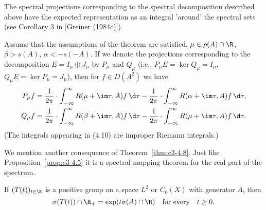 The spectral projections corresponding to the spectral decomposition
described above have the expected representation as an integral
'around' the spectral sets (see Corollary 3 in [Greiner (1984c)]).

\begin{corollary}\label{cor:c3-4.9}
Assume that the assumptions of the theorem are satisfied, $\mu \in \rho(A) \cap \R $, $\beta > s(A)$, $\alpha < -s(-A)$. If we denote the projections corresponding to the decomposition $E = I_{\mu} \oplus J_{\mu}$ by $P_{\mu}$ and $Q_{\mu}$
(i.e., $P_{\mu}E = \ker Q_{\mu} = I_{\mu}$, $Q_{\mu}E = \ker P_{\mu} = J_{\mu}$), then for $f \in D(A^2)$ we
have
\begin{equation}\label{eq:c3-4.10}
\begin{aligned}
	P_{\mu}f &= \frac{1}{2\pi} \cdot \int_{-\infty}^{\infty} R(\mu+\im\tau,A)f \, \d\tau - \frac{1}{2\pi} \cdot \int_{-\infty}^{\infty} R(\alpha+\im\tau,A)f \, \d\tau ,\\
	Q_{\mu}f &= \frac{1}{2\pi} \cdot \int_{-\infty}^{\infty} R(\beta+\im\tau,A)f \, \d\tau - \frac{1}{2\pi} \cdot \int_{-\infty}^{\infty} R(\mu+\im\tau,A)f \, \d\tau .
\end{aligned}
\end{equation}
(The integrals appearing in (4.10) are improper Riemann integrals.)
\end{corollary}
We mention another consequence of Theorem~\ref{thm:c3-4.8}. Just like Proposition~\ref{prop:c3-4.5} it is a
spectral mapping theorem for the real part of the spectrum.
%
%
\begin{corollary}\label{cor:c3-4.10}
If $(T(t))_{t \in \R }$ is a positive group on a space $L^2$ or
$C_0(X)$ with generator $A$, then
\begin{equation}\label{eq:c3-4.11}
	\sigma(T(t)) \cap \R _+ = \exp(t\sigma(A) \cap \R ) \quad \text{for every} \quad t \geq 0 .
\end{equation}
\end{corollary}

